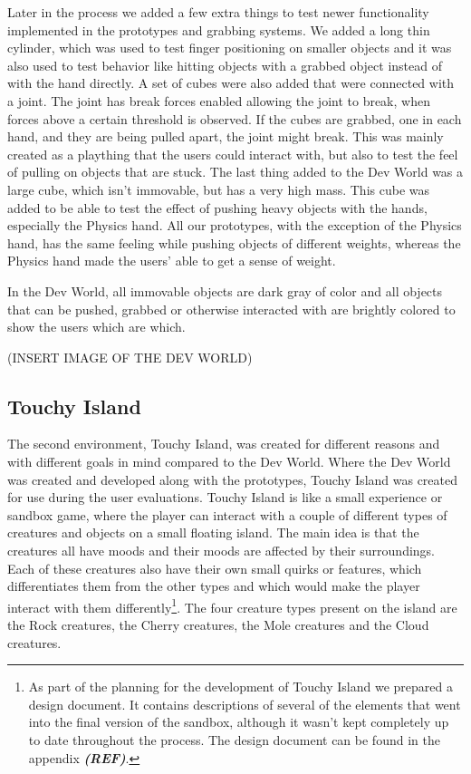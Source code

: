 Later in the process we added a few extra things to test newer functionality implemented in the prototypes and grabbing systems. We added a long thin cylinder, which was used to test finger positioning on smaller objects and it was also used to test behavior like hitting objects with a grabbed object instead of with the hand directly. A set of cubes were also added that were connected with a joint. The joint has break forces enabled allowing the joint to break, when forces above a certain threshold is observed. If the cubes are grabbed, one in each hand, and they are being pulled apart, the joint might break. This was mainly created as a plaything that the users could interact with, but also to test the feel of pulling on objects that are stuck. The last thing added to the Dev World was a large cube, which isn't immovable, but has a very high mass. This cube was added to be able to test the effect of pushing heavy objects with the hands, especially the Physics hand. All our prototypes, with the exception of the Physics hand, has the same feeling while pushing objects of different weights, whereas the Physics hand made the users' able to get a sense of weight.

In the Dev World, all immovable objects are dark gray of color and all objects that can be pushed, grabbed or otherwise interacted with are brightly colored to show the users which are which.

(INSERT IMAGE OF THE DEV WORLD)

\subsection{Touchy Island}
\label{subsec:touchyIsland}
The second environment, Touchy Island, was created for different reasons and with different goals in mind compared to the Dev World. Where the Dev World was created and developed along with the prototypes, Touchy Island was created for use during the user evaluations. Touchy Island is like a small experience or sandbox game, where the player can interact with a couple of different types of creatures and objects on a small floating island. The main idea is that the creatures all have moods and their moods are affected by their surroundings. Each of these creatures also have their own small quirks or features, which differentiates them from the other types and which would make the player interact with them differently\footnote{As part of the planning for the development of Touchy Island we prepared a design document. It contains descriptions of several of the elements that went into the final version of the sandbox, although it wasn't kept completely up to date throughout the process. The design document can be found in the appendix \textbf{\textit{(REF)}}.}. The four creature types present on the island are the Rock creatures, the Cherry creatures, the Mole creatures and the Cloud creatures.

